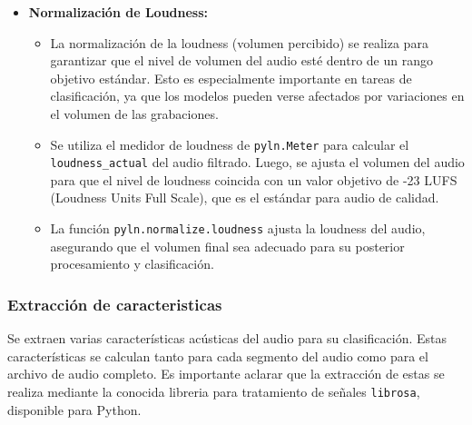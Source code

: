 \documentclass[12pt,a4paper]{article}
\begin{document}
\begin{itemize}
\item \textbf{Normalización de Loudness:}
  \begin{itemize}
    \item La normalización de la loudness (volumen percibido) se realiza para garantizar que el nivel de volumen del audio esté dentro de un rango objetivo estándar. Esto es especialmente importante en tareas de clasificación, ya que los modelos pueden verse afectados por variaciones en el volumen de las grabaciones.
    \item Se utiliza el medidor de loudness de \texttt{pyln.Meter} para calcular el \texttt{loudness\_actual} del audio filtrado. Luego, se ajusta el volumen del audio para que el nivel de loudness coincida con un valor objetivo de -23 LUFS (Loudness Units Full Scale), que es el estándar para audio de calidad.
    \item La función \texttt{pyln.normalize.loudness} ajusta la loudness del audio, asegurando que el volumen final sea adecuado para su posterior procesamiento y clasificación.
  \end{itemize}

\end{itemize}
\subsubsection*{Extracción de caracteristicas}
Se extraen varias características acústicas del audio para su clasificación. Estas características se calculan tanto para cada segmento del audio como para el archivo de audio completo. Es importante aclarar que la extracción de estas se realiza mediante la conocida libreria para tratamiento de señales \texttt{librosa}, disponible para Python.
\end{document}
